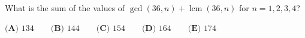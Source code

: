 What is the sum of the values of $\gcd(36,n)+\operatorname{lcm}(36,n)$ for $n=1,2,3,4$?

$\textbf{(A) }134\qquad\textbf{(B) }144\qquad\textbf{(C) }154\qquad\textbf{(D) }164\qquad\textbf{(E) }174$
